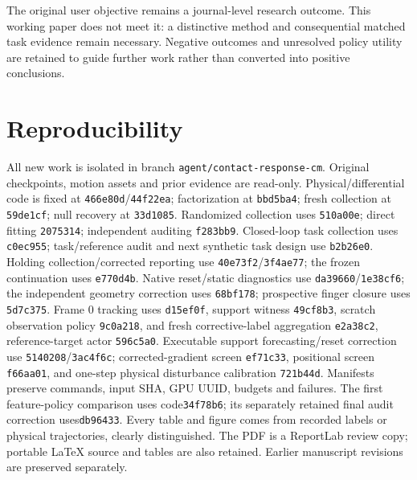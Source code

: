 \documentclass[10 pt]{article}
\begin{document}
The original user objective remains a journal-level research outcome. This working
paper does not meet it: a distinctive method and consequential matched task evidence
remain necessary. Negative outcomes and unresolved policy utility are retained
to guide further work rather than converted into positive conclusions.

\section*{Reproducibility}
All new work is isolated in branch \texttt{agent/contact-response-cm}. Original
checkpoints, motion assets and prior evidence are read-only. Physical/differential
code is fixed at \texttt{466e80d}/\texttt{44f22ea}; factorization at
\texttt{bbd5ba4}; fresh collection at \texttt{59de1cf}; null recovery at
\texttt{33d1085}. Randomized collection uses \texttt{510a00e}; direct fitting
\texttt{2075314}; independent auditing \texttt{f283bb9}. Closed-loop task
collection uses \texttt{c0ec955}; task/reference audit and next synthetic task
design use \texttt{b2b26e0}. Holding collection/corrected reporting use
\texttt{40e73f2}/\texttt{3f4ae77}; the frozen continuation uses \texttt{e770d4b}.
Native reset/static diagnostics use \texttt{da39660}/\texttt{1e38cf6}; the independent
geometry correction uses \texttt{68bf178}; prospective finger closure uses \texttt{5d7c375}. Frame 0 tracking uses \texttt{d15ef0f},
support witness \texttt{49cf8b3}, scratch observation policy \texttt{9c0a218}, and
fresh corrective-label aggregation \texttt{e2a38c2}, reference-target actor \texttt{596c5a0}.
Executable support forecasting/reset correction use \texttt{5140208}/\texttt{3ac4f6c};
corrected-gradient screen \texttt{ef71c33}, positional screen \texttt{f66aa01},
and one-step physical disturbance calibration \texttt{721b44d}.
Manifests preserve commands, input SHA, GPU UUID,
budgets and failures. The first feature-policy comparison uses code\texttt{34f78b6}; its separately
retained final audit correction uses\texttt{db96433}.
Every table and figure comes from recorded labels or physical trajectories, clearly distinguished.
The PDF is a ReportLab review copy; portable LaTeX source and tables are also
retained. Earlier manuscript revisions are preserved separately.
\end{document}
